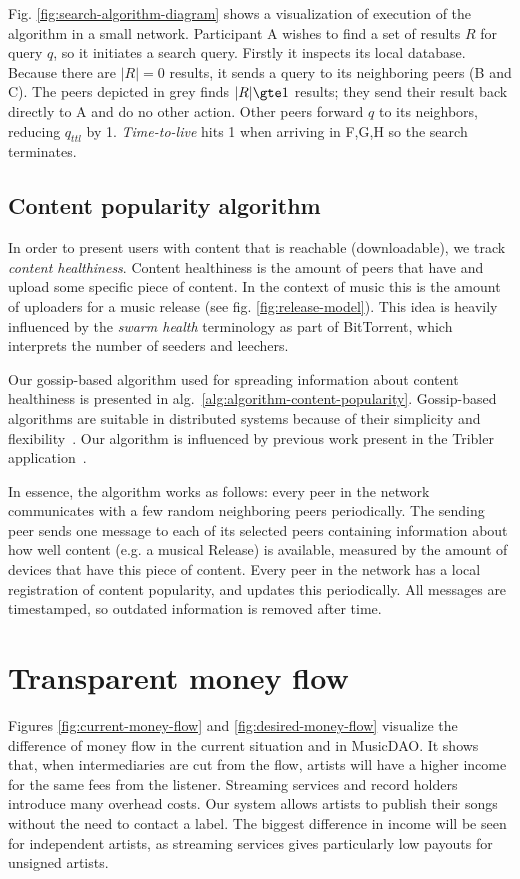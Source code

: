 Fig. \ref{fig:search-algorithm-diagram} shows a visualization of execution of the algorithm in a small network. Participant A wishes to find a set of results $R$ for query $q$, so it initiates a search query. Firstly it inspects its local database. Because there are $|R|=0$ results, it sends a query to its neighboring peers (B and C). The peers depicted in grey finds $|R|\gte 1$ results; they send their result back directly to A and do no other action. Other peers forward $q$ to its neighbors, reducing $q_{ttl}$ by 1. \textit{Time-to-live} hits 1 when arriving in F,G,H so the search terminates. 

\subsection{Content popularity algorithm}
In order to present users with content that is reachable (downloadable), we track \textit{content healthiness}. Content healthiness is the amount of peers that have and upload some specific piece of content. In the context of music this is the amount of uploaders for a music release (see fig. \ref{fig:release-model}). This idea is heavily influenced by the \textit{swarm health} terminology as part of BitTorrent, which interprets the number of seeders and leechers.


Our gossip-based algorithm used for spreading information about content healthiness is presented in alg.~\ref{alg:algorithm-content-popularity}. Gossip-based algorithms are suitable in distributed systems because of their simplicity and flexibility~\citep{kermarrec2007gossiping}. Our algorithm is influenced by previous work present in the Tribler application~\citep{pouwelse2008tribler}. 

In essence, the algorithm works as follows: every peer in the network communicates with a few random neighboring peers periodically. The sending peer sends one message to each of its selected peers containing information about how well content (e.g. a musical Release) is available, measured by the amount of devices that have this piece of content. Every peer in the network has a local registration of content popularity, and updates this periodically. All messages are timestamped, so outdated information is removed after time.



\section{Transparent money flow}
Figures \ref{fig:current-money-flow} and \ref{fig:desired-money-flow} visualize the difference of money flow in the current situation and in MusicDAO. It shows that, when intermediaries are cut from the flow, artists will have a higher income for the same fees from the listener. Streaming services and record holders introduce many overhead costs. Our system allows artists to publish their songs without the need to contact a label. The biggest difference in income will be seen for independent artists, as streaming services gives particularly low payouts for unsigned artists.

